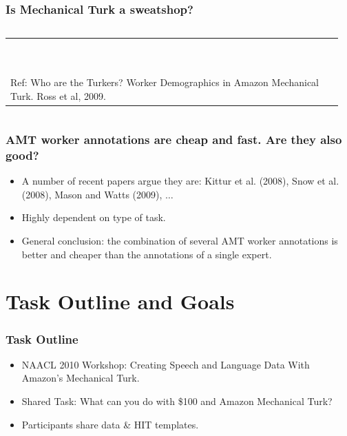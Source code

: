 \documentclass[10pt]{beamer}
\newenvironment{itemwide}%
{\begin{itemize}%
    \setlength{\itemsep}{5pt}%
    \setlength{\parskip}{5pt}}%
  {\end{itemize}}
\begin{document}
\begin{frame}
  \frametitle{Is Mechanical Turk a sweatshop?}
\begin{columns}[T]
\begin{column}{5cm}

\begin{footnotesize}
\begin{tabular}{p{4cm}}
\\ \\ \\ \\ \\ \\ \\ \\ \\ \\ \\
 Ref: Who are the Turkers? Worker Demographics in Amazon Mechanical Turk. Ross et al, 2009.
\end{tabular} 
\end{footnotesize}
\end{column}
\begin{column}{5cm}
\end{column}
\end{columns}
\end{frame}

\begin{frame}
  \frametitle{AMT worker annotations are cheap and fast. Are they also good?}
	\begin{itemwide}
 	\item A number of recent papers argue they are: Kittur et al. (2008), Snow et al. (2008), Mason and Watts (2009), $\ldots$
	\item Highly dependent on type of task.
	\item General conclusion: the combination of several AMT worker annotations is better and cheaper than the annotations of a single expert.
	\end{itemwide}
\end{frame}

\section{Task Outline and Goals}

\begin{frame}
  \frametitle{Task Outline}
\begin{itemwide}
 \item NAACL 2010 Workshop: Creating Speech and Language Data With Amazon's Mechanical Turk.
 \item Shared Task: What can you do with \$100 and Amazon Mechanical Turk?
 \item Participants share data \& HIT templates.
\end{itemwide}

\end{frame}
\end{document}
